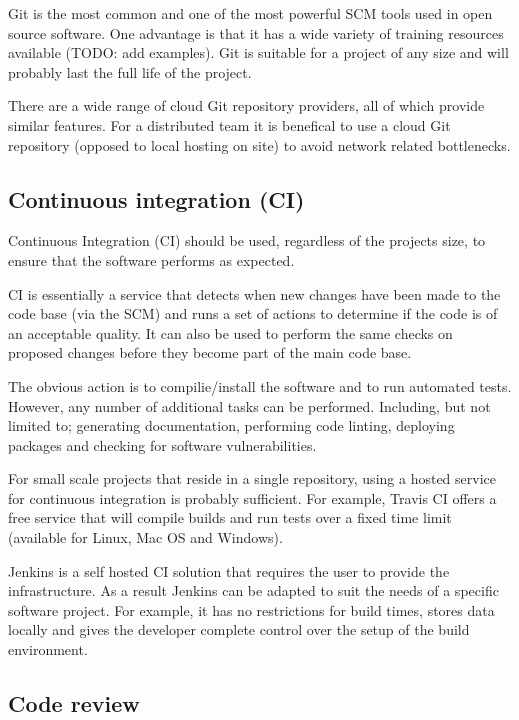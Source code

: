 \documentclass[jnr]{iosart2x}
\begin{document}
Git \cite{Git} is the most common and one of the most powerful SCM tools used in open source software. 
One advantage is that it has a wide variety of training resources available (TODO: add examples).
Git is suitable for a project of any size and will probably last the full life of the project.

There are a wide range of cloud Git repository providers, all of which provide similar features.
For a distributed team it is benefical to use a cloud Git repository (opposed to local hosting on site) to avoid network related bottlenecks.

\subsection{Continuous integration (CI)}
\label{Continuous integration}

Continuous Integration (CI) should be used, regardless of the projects size, to ensure that the software performs as expected.

CI is essentially a service that detects when new changes have been made to the code base (via the SCM) and runs a set of actions to determine if the code is of an acceptable quality.
It can also be used to perform the same checks on proposed changes before they become part of the main code base.

The obvious action is to compilie/install the software and to run automated tests. However, any number of additional tasks can be performed. Including, but not limited to; generating documentation, performing code linting, deploying packages and checking for software vulnerabilities.

For small scale projects that reside in a single repository, using a hosted service for continuous integration is probably sufficient.
For example, Travis CI \cite{Travis_CI} offers a free service that will compile builds and run tests over a fixed time limit (available for Linux, Mac OS and Windows).

Jenkins \cite{Jenkins} is a self hosted CI solution that requires the user to provide the infrastructure.
As a result Jenkins can be adapted to suit the needs of a specific software project. 
For example, it has no restrictions for build times, stores data locally and gives the developer complete control over the setup of the build environment.

\subsection{Code review}
\label{Code review}
\end{document}
